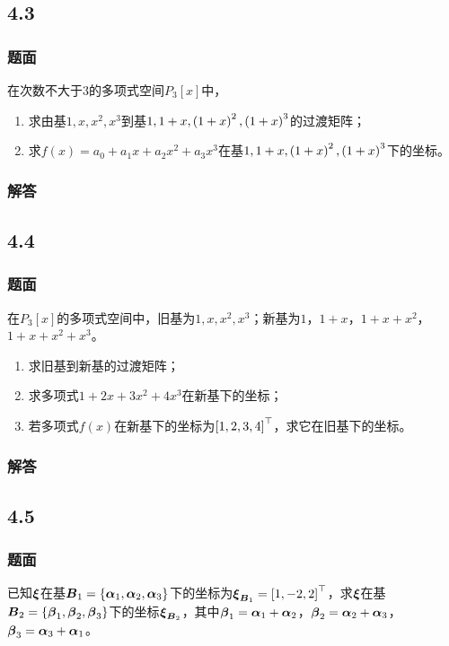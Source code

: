 \documentclass{beamer}
\begin{document}
\subsection*{4.3}
\begin{frame}
    \frametitle{题面}

    在次数不大于\(3\)的多项式空间\(P_3[x]\)中，
    \begin{enumerate}
        \item 求由基\(1,x,x^2,x^3\)到基\(1,1+x,\left( 1+x \right)^2,\left( 1+x \right)^3\)的过渡矩阵；
        \item 求\(f(x)=a_0+a_1x+a_2x^2+a_3x^3\)在基\(1,1+x,\left( 1+x \right)^2,\left( 1+x \right)^3\)下的坐标。
    \end{enumerate}

\end{frame}

\begin{frame}
    \frametitle{解答}



\end{frame}

\subsection*{4.4}
\begin{frame}
    \frametitle{题面}

    在\(P_3[x]\)的多项式空间中，旧基为\(1,x,x^2,x^3\)；新基为\(1\)，\(1+x\)，\(1+x+x^2\)，\(1+x+x^2+x^3\)。
    \begin{enumerate}
        \item 求旧基到新基的过渡矩阵；
        \item 求多项式\(1+2x+3x^2+4x^3\)在新基下的坐标；
        \item 若多项式\(f(x)\)在新基下的坐标为\(\left[ 1,2,3,4 \right]^\top\)，求它在旧基下的坐标。
    \end{enumerate}

\end{frame}

\begin{frame}
    \frametitle{解答}



\end{frame}

\subsection*{4.5}
\begin{frame}
    \frametitle{题面}

    已知\(\boldsymbol{\xi}\)在基\(\boldsymbol{B}_1=\left\{\boldsymbol{\alpha}_1,\boldsymbol{\alpha}_2,\boldsymbol{\alpha}_3 \right\}\)下的坐标为\(\boldsymbol{\xi}_{\boldsymbol{B}_1}=\left[ 1,-2,2 \right]^\top\)，求\(\boldsymbol{\xi}\)在基\(\boldsymbol{B}_2=\left\{\boldsymbol{\beta}_1,\boldsymbol{\beta}_2,\boldsymbol{\beta}_3 \right\}\)下的坐标\(\boldsymbol{\xi}_{\boldsymbol{B}_2}\)，其中\(\boldsymbol{\beta}_1=\boldsymbol{\alpha}_1+\boldsymbol{\alpha}_2\)，\(\boldsymbol{\beta}_2=\boldsymbol{\alpha}_2+\boldsymbol{\alpha}_3\)，\(\boldsymbol{\beta}_3=\boldsymbol{\alpha}_3+\boldsymbol{\alpha}_1\)。

\end{frame}
\end{document}
